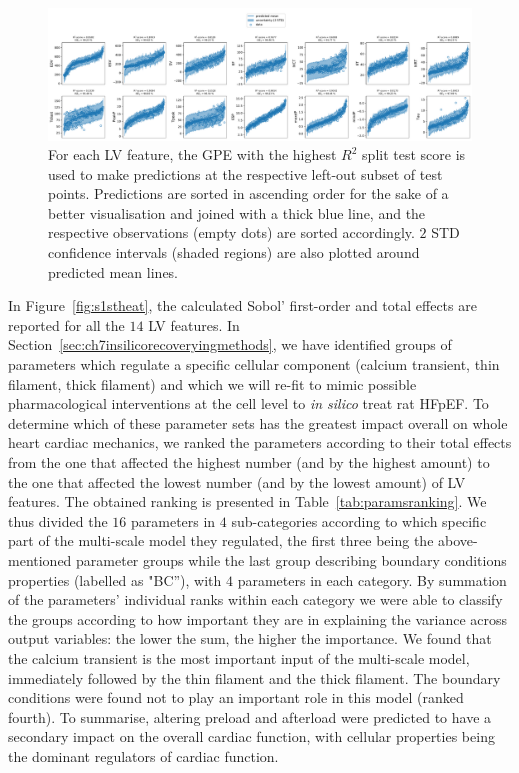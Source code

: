 \begin{figure}[!ht]
    \myfloatalign
    \includegraphics[width=\textwidth]{figures/chapter07/bgpes_vs_bsplit_16p.pdf}
    \caption{For each LV feature, the GPE with the highest $R^2$ split test score is used to make predictions at the respective left-out subset of test points. Predictions are sorted in ascending order for the sake of a better visualisation and joined with a thick blue line, and the respective observations (empty dots) are sorted accordingly. $2$ STD confidence intervals (shaded regions) are also plotted around predicted mean lines.}
    \label{fig:bgpevsbsplitfinal}
\end{figure}

\vspace{0.2cm}
In Figure~\ref{fig:s1stheat}, the calculated Sobol' first-order and total effects are reported for all the $14$ LV features. In Section~\ref{sec:ch7insilicorecoveryingmethods}, we have identified groups of parameters which regulate a specific cellular component (calcium transient, thin filament, thick filament) and which we will re-fit to mimic possible pharmacological interventions at the cell level to \textit{in silico} treat rat HFpEF. To determine which of these parameter sets has the greatest impact overall on whole heart cardiac mechanics, we ranked the parameters according to their total effects from the one that affected the highest number (and by the highest amount) to the one that affected the lowest number (and by the lowest amount) of LV features. The obtained ranking is presented in Table~\ref{tab:paramsranking}. We thus divided the $16$ parameters in $4$ sub-categories according to which specific part of the multi-scale model they regulated, the first three being the above-mentioned parameter groups while the last group describing boundary conditions properties (labelled as "BC''), with $4$ parameters in each category. By summation of the parameters' individual ranks within each category we were able to classify the groups according to how important they are in explaining the variance across output variables: the lower the sum, the higher the importance. We found that the calcium transient is the most important input of the multi-scale model, immediately followed by the thin filament and the thick filament. The boundary conditions were found not to play an important role in this model (ranked fourth). To summarise, altering preload and afterload were predicted to have a secondary impact on the overall cardiac function, with cellular properties being the dominant regulators of cardiac function.


